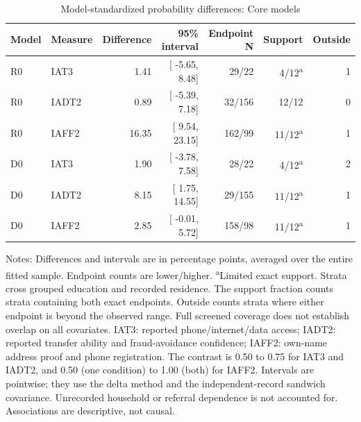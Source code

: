 \begin{table}[tbp]\centering\small
\caption{Model-standardized probability differences: Core models}\label{tab:det-core}
\begin{tabular}{llrrrrr}\toprule
Model & Measure & Difference & 95\% interval & Endpoint N & Support & Outside \\
\midrule
R0 & IAT3 &   1.41 & [ -5.65,   8.48] & 29/22 & 4/12\textsuperscript{a} & 1 \\
R0 & IADT2 &   0.89 & [ -5.39,   7.18] & 32/156 & 12/12 & 0 \\
R0 & IAFF2 &  16.35 & [  9.54,  23.15] & 162/99 & 11/12\textsuperscript{a} & 1 \\
D0 & IAT3 &   1.90 & [ -3.78,   7.58] & 28/22 & 4/12\textsuperscript{a} & 2 \\
D0 & IADT2 &   8.15 & [  1.75,  14.55] & 29/155 & 11/12\textsuperscript{a} & 1 \\
D0 & IAFF2 &   2.85 & [ -0.01,   5.72] & 158/98 & 11/12\textsuperscript{a} & 1 \\
\bottomrule\end{tabular}
\par\smallskip\begin{minipage}{0.96\linewidth}\footnotesize\raggedright Notes: Differences and intervals are in percentage points, averaged over the entire fitted sample. Endpoint counts are lower/higher. \textsuperscript{a}Limited exact support. Strata cross grouped education and recorded residence. The support fraction counts strata containing both exact endpoints. Outside counts strata where either endpoint is beyond the observed range. Full screened coverage does not establish overlap on all covariates. IAT3: reported phone/internet/data access; IADT2: reported transfer ability and fraud-avoidance confidence; IAFF2: own-name address proof and phone registration. The contrast is 0.50 to 0.75 for IAT3 and IADT2, and 0.50 (one condition) to 1.00 (both) for IAFF2. Intervals are pointwise; they use the delta method and the independent-record sandwich covariance. Unrecorded household or referral dependence is not accounted for. Associations are descriptive, not causal. \end{minipage}\end{table}
